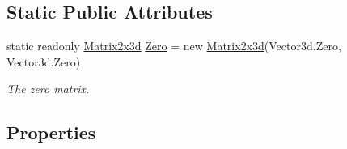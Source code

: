 \subsection*{Static Public Attributes}
\begin{DoxyCompactItemize}
\item 
static readonly \hyperlink{struct_open_t_k_1_1_matrix2x3d}{Matrix2x3d} \hyperlink{struct_open_t_k_1_1_matrix2x3d_a7d6d2ce6fe3cdc7145c3ccbef3a2ac15}{Zero} = new \hyperlink{struct_open_t_k_1_1_matrix2x3d}{Matrix2x3d}(Vector3d.\-Zero, Vector3d.\-Zero)
\begin{DoxyCompactList}\small\item\em The zero matrix. \end{DoxyCompactList}\end{DoxyCompactItemize}
\subsection*{Properties}
